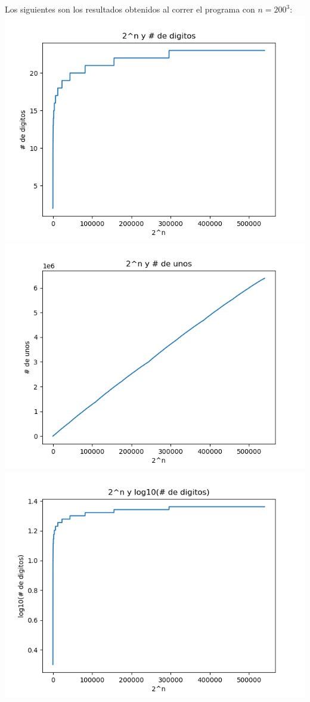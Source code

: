 \documentclass{article}
\begin{document}
Los siguientes son los resultados obtenidos al correr el programa con $n = 200^3$:
\includegraphics{Graph1.png}
\includegraphics{Graph2.png}
\includegraphics{Graph3.png}
\end{document}
